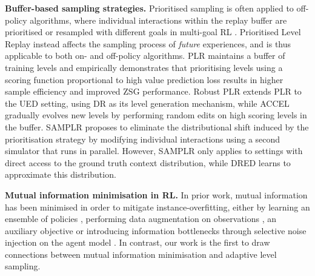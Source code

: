 \textbf{Buffer-based sampling strategies.} Prioritised sampling is often applied to off-policy algorithms, where individual interactions within the replay buffer are prioritised \citep{Schaul2015PrioritizedER} or resampled with different goals in multi-goal RL \citep{HER,zhang2020automatic}. Prioritised Level Replay \citep[PLR,][]{PLR} instead affects the sampling process of \textit{future} experiences, and is thus applicable to both on- and off-policy algorithms. PLR maintains a buffer of training levels and empirically demonstrates that prioritising levels using a scoring function proportional to high value prediction loss results in higher sample efficiency and improved ZSG performance. Robust PLR \citep[RPLR,][]{Robust-PLR} extends PLR to the UED setting, using DR as its level generation mechanism, while ACCEL \citep{ACCEL} gradually evolves new levels by performing random edits on high scoring levels in the buffer. SAMPLR \citep{SAMPLR} proposes to  eliminate the distributional shift induced by the prioritisation strategy by modifying individual interactions using a second simulator that runs in parallel. However, SAMPLR only applies to settings with direct access to the ground truth context distribution, while DRED learns to approximate this distribution.



\textbf{Mutual information minimisation in RL.} In prior work, mutual information has been minimised in order to mitigate instance-overfitting, either by learning an ensemble of policies \citep{instance_invariant,E-POMDP}, performing data augmentation on observations \citep{raileanu2021UCB-DrAC,yarats2021image}, an auxiliary objective \citep{mhairiCMID,dunion2024mvd} or introducing information bottlenecks through selective noise injection on the agent model \citep{vib_actor_critic,coinrun}. In contrast, our work is the first to draw connections between mutual information minimisation and adaptive level sampling.
%
